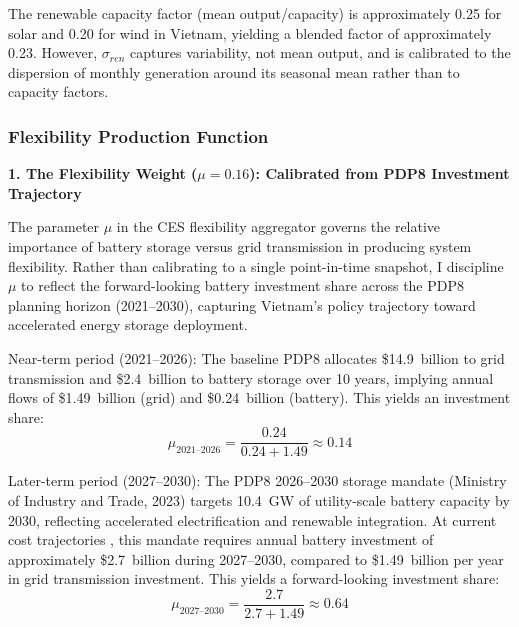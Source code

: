 \documentclass[12pt, a4paper]{article}
\begin{document}
	The renewable capacity factor (mean output/capacity) is approximately 0.25 for solar and 0.20 for wind in Vietnam, yielding a blended factor of approximately 0.23. However, $\sigma_{ren}$ captures variability, not mean output, and is calibrated to the dispersion of monthly generation around its seasonal mean rather than to capacity factors.
	
	\subsubsection{Flexibility Production Function}
	
	\textbf{1. The Flexibility Weight ($\mu = 0.16$): Calibrated from PDP8 Investment Trajectory}

	The parameter $\mu$ in the CES flexibility aggregator governs the relative importance of battery storage versus grid transmission in producing system flexibility. Rather than calibrating to a single point-in-time snapshot, I discipline $\mu$ to reflect the forward-looking battery investment share across the PDP8 planning horizon (2021--2030), capturing Vietnam's policy trajectory toward accelerated energy storage deployment.

	Near-term period (2021--2026): The baseline PDP8 allocates \$14.9~billion to grid transmission and \$2.4~billion to battery storage over 10 years, implying annual flows of \$1.49~billion (grid) and \$0.24~billion (battery). This yields an investment share:
	\begin{equation}
		\mu_{\text{2021--2026}} = \frac{0.24}{0.24 + 1.49} \approx 0.14
		\label{eq:mu_early}
	\end{equation}

	Later-term period (2027--2030): The PDP8 2026--2030 storage mandate (Ministry of Industry and Trade, 2023) targets 10.4~GW of utility-scale battery capacity by 2030, reflecting accelerated electrification and renewable integration. At current cost trajectories \citep{bloombergnef2023}, this mandate requires annual battery investment of approximately \$2.7~billion during 2027--2030, compared to \$1.49~billion per year in grid transmission investment. This yields a forward-looking investment share:
	\begin{equation}
		\mu_{\text{2027--2030}} = \frac{2.7}{2.7 + 1.49} \approx 0.64
		\label{eq:mu_late}
	\end{equation}
\end{document}
